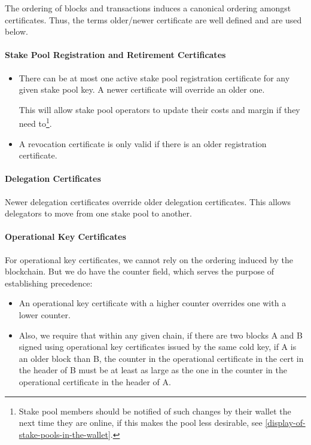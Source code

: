 \documentclass[11pt,a4paper,dvipsnames,twosided]{article}
\begin{document}
The ordering of blocks and transactions induces a canonical ordering
amongst certificates. Thus, the terms older/newer certificate are well
defined and are used below.

\paragraph{Stake Pool Registration and Retirement Certificates}
\label{stake-pool-registration-and-retirement-certificates}

\begin{itemize}
\item
  There can be at most one active stake pool registration certificate
  for any given stake pool key. A newer certificate will override an older
  one.

  This will allow stake pool operators to update their costs and margin
  if they need to\footnote{Stake pool members should be notified of such changes
  by their wallet the next time they are online, if this makes the pool less
  desirable, see \cref{display-of-stake-pools-in-the-wallet}.}.
\item
  A revocation certificate is only valid if there is an older
  registration certificate.
\end{itemize}

\paragraph{Delegation Certificates}

Newer delegation certificates override older delegation certificates. This
allows delegators to move from one stake pool to another.

\paragraph{Operational Key Certificates}
\label{operational-key-certificates-1}

For operational key certificates, we cannot rely on the ordering induced by
the blockchain. But we do have the counter field, which serves the
purpose of establishing precedence:

\begin{itemize}
\item
  An operational key certificate with a higher counter overrides one with a
  lower counter.
\item
  Also, we require that within any given chain, if there are two blocks A and B
  signed using operational key certificates issued by the same cold key, if A is
  an older block than B, the counter in the operational certificate in the cert
  in the header of B must be at least as large as the one in the counter in the
  operational certificate in the header of A.
\end{itemize}
\end{document}
